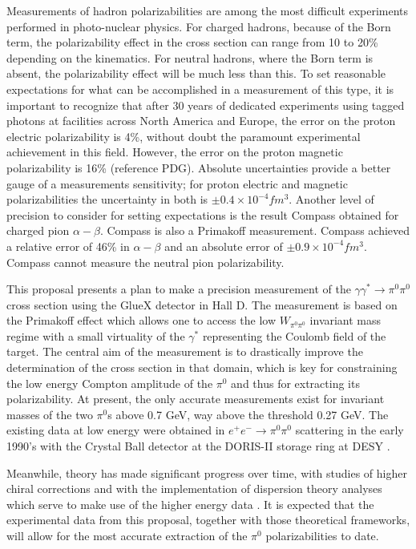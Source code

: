 Measurements of hadron polarizabilities are among the most difficult experiments performed in photo-nuclear physics. For charged hadrons, because of the Born term,  the polarizability effect in the cross section can range from 10 to 20\% depending on the kinematics.   For neutral hadrons, where the Born term is absent, the polarizability effect will be much less than this.    To set reasonable expectations for what can be accomplished in a measurement of this type, it is important to recognize that after 30 years of dedicated experiments using tagged photons at facilities across North America and Europe, the error on the proton electric polarizability is 4\%, without doubt the paramount experimental achievement in this field. However, the error on the proton magnetic polarizability is 16\% (reference PDG).  Absolute uncertainties provide a better gauge of a measurements sensitivity;  for proton electric and magnetic polarizabilities  the uncertainty in both is $\pm 0.4 \times 10^{-4} fm^3$.   Another level of precision to consider for setting expectations is the result Compass obtained for charged pion $\alpha - \beta$. Compass is also a Primakoff measurement. Compass achieved a relative error of 46\% in $\alpha - \beta$ and an absolute error of $\pm 0.9 \times 10^{-4} fm^3$.  Compass cannot measure the neutral pion polarizability. 



This proposal presents a plan to make a precision measurement of the
$\gamma \gamma^* \rightarrow \pi^0 \pi^0$ cross section using the
GlueX detector in Hall D.  The measurement is based on the Primakoff
effect which allows one to access the low $W_{\pi^0\pi^0}$ invariant
mass regime with a small virtuality of the $\gamma^*$ representing the
Coulomb field of the target. The central aim of the measurement is to
drastically improve the determination of the cross section in that
domain, which is key for constraining the low energy Compton amplitude
of the $\pi^0$ and thus for extracting its polarizability.  At
present, the only accurate measurements exist for invariant masses of
the two $\pi^0$s above 0.7 GeV, way above the threshold 0.27 GeV. The
existing data at low energy were obtained in $e^+ e^- \to \pi^0\pi^0 $
scattering in the early 1990's with the Crystal Ball detector at the
DORIS-II storage ring at DESY \cite{Marsiske:1990hx}.

Meanwhile, theory has made significant progress over time, with
studies of higher chiral corrections 
\cite{Bellucci:1994eb,Gasser:2005ud,Aleksejevs:2014eea} and with the
implementation of dispersion theory analyses which serve to make use
of the higher energy data
\cite{Oller:2008kf,Dai:2014zta,Dai:2014lza,Moussallam:2013una}. It is
expected that the experimental data from this proposal, together with
those theoretical frameworks, will allow for the most accurate
extraction of the $\pi^0$ polarizabilities to date.
